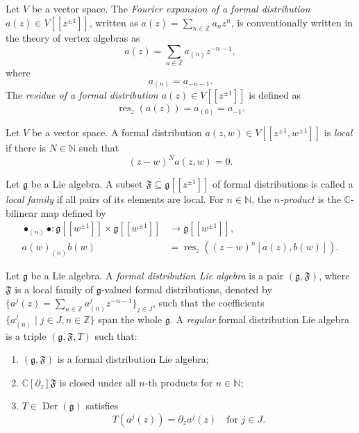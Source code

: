 \documentclass[a4paper, 12pt, reqno]{amsart}
\theoremstyle{remark}
\DeclareMathOperator{\res}{res}
\DeclareMathOperator{\Der}{Der}
\begin{document}
Let $V$ be a vector space.
The \emph{Fourier expansion of a formal distribution $a(z) \in V[[z^{\pm1}]]$}, written as $a(z) = \sum_{n \in \mathbb{Z}}a_nz^n$, is conventionally written in the theory of vertex algebras as
\begin{equation*}
  a(z) = \sum_{n \in \mathbb{Z}}a_{(n)}z^{-n - 1},
\end{equation*}
where
\begin{equation*}
  a_{(n)} = a_{-n - 1}.
\end{equation*}
The \emph{residue of a formal distribution $a(z) \in V[[z^{\pm1}]]$} is defined as
\begin{equation*}
  \res_z(a(z)) = a_{(0)} = a_{-1}.
\end{equation*}

Let $V$ be a vector space.
A formal distribution $a(z, w) \in V[[z^{\pm1}, w^{\pm1}]]$ is \emph{local} if there is $N \in \mathbb{N}$ such that
\begin{equation*}
  (z - w)^Na(z, w) = 0.
\end{equation*}

Let $\mathfrak{g}$ be a Lie algebra.
A subset $\mathfrak{F} \subseteq \mathfrak{g}[[z^{\pm1}]]$ of formal distributions is called a \emph{local family} if all pairs of its elements are local.
For $n \in \mathbb{N}$, the \emph{$n$-product} is the $\mathbb{C}$-bilinear map defined by
\begin{align*}
  \bullet_{(n)}\bullet: \mathfrak{g}[[w^{\pm1}]] \times \mathfrak{g}[[w^{\pm1}]] &\to \mathfrak{g}[[w^{\pm1}]], \\
  a(w)_{(n)}b(w) &= \res_z((z - w)^n[a(z), b(w)]).
\end{align*}

Let $\mathfrak{g}$ be a Lie algebra.
A \emph{formal distribution Lie algebra} is a pair $(\mathfrak{g}, \mathfrak{F})$, where $\mathfrak{F}$ is a local family of $\mathfrak{g}$-valued formal distributions, denoted by $\{a^j(z) = \sum_{n \in \mathbb{Z}}a^j_{(n)}z^{-n - 1}\}_{j \in J}$, such that the coefficients $\{a^j_{(n)} \mid j \in J, n \in \mathbb{Z}\}$ span the whole $\mathfrak{g}$.
A \emph{regular} formal distribution Lie algebra is a triple $(\mathfrak{g}, \mathfrak{F}, T)$ such that:
\begin{enumerate}
\item $(\mathfrak{g}, \mathfrak{F})$ is a formal distribution Lie algebra;
\item $\mathbb{C}[\partial_z]\mathfrak{F}$ is closed under all $n$-th products for $n \in \mathbb{N}$;
\item $T \in \Der(\mathfrak{g})$ satisfies
  \begin{equation*}
    T(a^j(z)) = \partial_za^j(z) \quad \text{for $j \in J$}.
  \end{equation*}
\end{enumerate}
\end{document}
